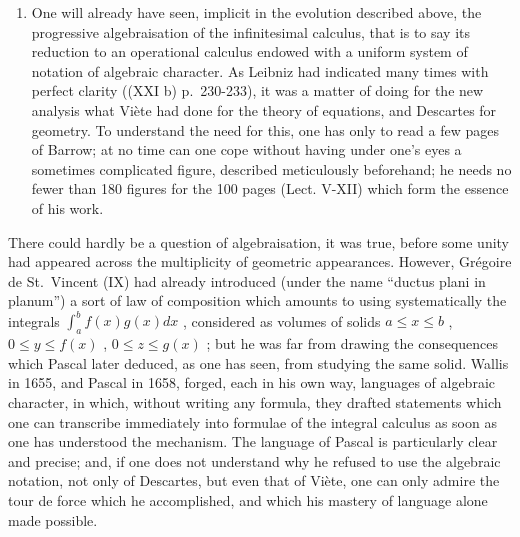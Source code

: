 \begin{enumerate}
\def\labelenumi{\Alph{enumi})}
\setcounter{enumi}{5}
\tightlist
\item
  One will already have seen, implicit in the evolution described above, the progressive algebraisation of the infinitesimal calculus, that is to say its reduction to an operational calculus endowed with a uniform system of notation of algebraic character. As Leibniz had indicated many times with perfect clarity ((XXI b) p.~230-233), it was a matter of doing for the new analysis what Viète had done for the theory of equations, and Descartes for geometry. To understand the need for this, one has only to read a few pages of Barrow; at no time can one cope without having under one's eyes a sometimes complicated figure, described meticulously beforehand; he needs no fewer than 180 figures for the 100 pages (Lect. V-XII) which form the essence of his work.
\end{enumerate}

There could hardly be a question of algebraisation, it was true, before some unity had appeared across the multiplicity of geometric appearances. However, Grégoire de St.~Vincent (IX) had already introduced (under the name ``ductus plani in planum'') a sort of law of composition which amounts to using systematically the integrals \(\int_{a}^{b}f(x)g(x)dx\) , considered as volumes of solids \(a \leqslant x \leqslant b\) , \(0 \leqslant y \leqslant f(x)\) , \(0 \leqslant z \leqslant g(x)\) ; but he was far from drawing the consequences which Pascal later deduced, as one has seen, from studying the same solid. Wallis in 1655, and Pascal in 1658, forged, each in his own way, languages of algebraic character, in which, without writing any formula, they drafted statements which one can transcribe immediately into formulae of the integral calculus as soon as one has understood the mechanism. The language of Pascal is particularly clear and precise; and, if one does not understand why he refused to use the algebraic notation, not only of Descartes, but even that of Viète, one can only admire the tour de force which he accomplished, and which his mastery of language alone made possible.

